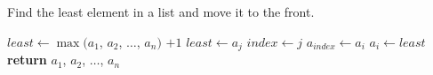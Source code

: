 \documentclass[a4paper, 12pt]{article}
\begin{document}
	
	\begin{algorithm}

		\renewcommand{\thealgorithm}{3.1.42}
		
		\caption{Find the least element in a list and move it to the front.}
		
		\begin{algorithmic}[1]
			
			
				\State $least \gets \max (a_1$, $a_2$, $\dots$, $a_n)$ $+ 1$
						\State $least \gets a_j$
						\State $index \gets j$
					\EndIf
				\EndFor
				\State $a_{index} \gets a_i$
				\State $a_i \gets least$
			\EndFor
			\State \textbf{return} $a_1$, $a_2$, $\dots$, $a_n$
			\EndProcedure
			
		\end{algorithmic}

	\end{algorithm}
\end{document}

